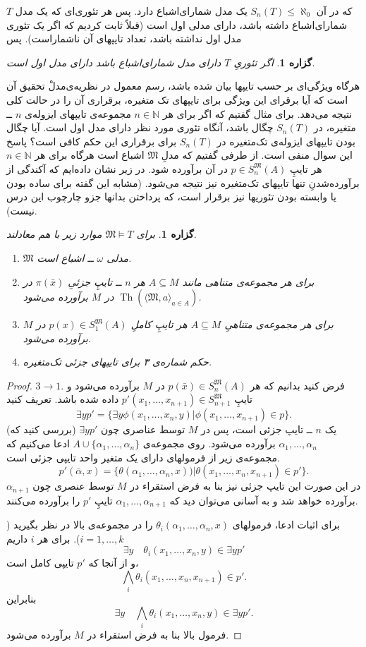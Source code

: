 \documentclass[12pt,a4paper]{report}
\theoremstyle{colorhead}
\newtheorem{prop}[thm]{گزاره}
\DeclareMathOperator{\Th}{Th}
\begin{document}
$T$
که در آن
$S_n(T)\leq \aleph_0$
یک مدل شمارای‌اشباع دارد. پس هر تئوری‌ای که یک مدل شمارای‌اشباع داشته باشد، 
دارای مدلی اول است (قبلاً ثابت کردیم که اگر یک تئوری
مدل اول نداشته باشد، تعداد تایپهای آن ناشماراست). پس
\begin{prop}
اگر
تئوریِ
$T$
دارای مدل شمارای‌اشباع باشد 
دارای مدل اول است.
\end{prop}
هرگاه ویژگی‌ای بر حسب تایپها بیان شده باشد، 
رسم معمول در نظریه‌ی‌مدلْ تحقیق آن است که
آیا
برقرای این ویژگی 
برای تایپهای تک متغیره، برقراری آن را در حالت کلی  نتیجه می‌دهد. برای مثال گفتیم که
اگر برای
هر
$n\in \mathbb{N}$
مجموعه‌ی
تایپهای ایزوله‌ی
$n$
ــ
متغیره‌، در
$S_n(T)$
چگال باشد، آنگاه تئوری مورد نظر دارای مدل اول است. آیا 
چگال بودن تایپهای ایزوله‌ی تک‌متغیره‌ در
$S_n(T)$
برای برقراری  این حکم کافی است؟ پاسخ این سوال منفی است. از طرفی گفتیم که مدلِ
$\mathfrak{M}$
اشباع است هرگاه برای هر
$n\in \mathbb{N}$
هر تایپِ
$p\in S_n^\mathfrak{M}(A)$
در آن برآورده شود. در زیر نشان داده‌ایم
که آکندگی از برآورده‌شدنِ تنها تایپهای تک‌متغیره نیز نتیجه می‌شود.
(مشابه این گفته برای ساده بودن یا وابسته بودن تئوریها نیز برقرار است، که پرداختن بدانها جزو چارچوب این درس نیست).
\begin{prop}
برای
$\mathfrak{M}\models T$
موارد زیر با هم معادلند.
\begin{enumerate}
\item
$\mathfrak{M}$
مدلی 
$\omega$ 
ــ 
اشباع است.
\item
برای هر مجموعه‌ی متناهی مانند
$A\subseteq M$
هر
$n$ ــ
تایپِ جزئیِ
$\pi(\bar{x})$
در
$\Th(\langle\mathfrak{M},a\rangle_{a\in  A})$
در
$M$
برآورده می‌شود.
\item
برای هر مجموعه‌ی متناهیِ
$A\subseteq M$
هر تایپِ کاملِ
$p(x)\in S_1^\mathfrak{M}(A)$
در
$M$
برآورده می‌شود.
\item 
حکم شماره‌ی ۳ برای تایپهای جزئی تک‌متغیره.
\end{enumerate}
\end{prop}
\begin{proof}
$3\to 1$.
فرض کنید 
بدانیم که
هر
$p(\bar{x})\in S_n^{\mathfrak{M}}(A)$
در
$M$
برآورده می‌شود و تایپِ
$p'(x_1,\ldots,x_{n+1})\in S_{n+1}^{\mathfrak{M}}$
داده شده باشد. تعریف کنید
\[
\exists y p'=\{\exists y \phi(x_1,\ldots,x_{n}, y)| \phi(x_1,\ldots,x_{n+1})\in p\}.
\]
(بررسی کنید که)
$\exists y p'$
یک
$n$ ــ
تایپ جزئی است، پس در
$M$
توسط عناصری چون
$\alpha_1,\ldots,\alpha_n$
برآورده می‌شود. روی مجموعه‌ی
$A\cup \{\alpha_1,\ldots,\alpha_n\}$
ادعا می‌کنیم که مجموعه‌ی زیر از فرمولهای دارای یک متغیر واحد تایپی جزئی است.
\[
p'(\bar{\alpha},x)=\{\theta(\alpha_1,\ldots,\alpha_n,x))|\theta(x_1,\ldots,x_n,x_{n+1})\in p'\}.
\]
در این صورت
این تایپ جزئی نیز بنا به فرض استقراء در
$M$
توسط عنصری چون
$\alpha_{n+1}$
برآورده خواهد شد و به آسانی می‌توان دید که 
$\alpha_1,\ldots,\alpha_{n+1}$
تایپِ
$p'$
را برآورده می‌کنند. 
\par 
برای اثبات ادعا، فرمولهای
$\theta_i(\alpha_1,\ldots,\alpha_n,x)$
را در مجموعه‌ی بالا در نظر بگیرید
 (\mbox{$i=1,\ldots,k$}).
برای هر
$i$
داریم
\[\exists y\quad \theta_i(x_1,\ldots,x_n,y)\in \exists y p'\]
و
از آنجا که 
$p'$
تایپی کامل است،
\[
\bigwedge_i \theta_i (x_1,\ldots,x_n,x_{n+1})\in p'.
\]
بنابراین
\[
\exists y\quad \bigwedge_i \theta_i(x_1,\ldots,x_n,y)\in \exists y p'.
\]
فرمول بالا بنا به فرض استقراء در
$M$
برآورده می‌شود.
\end{proof}
\end{document}
